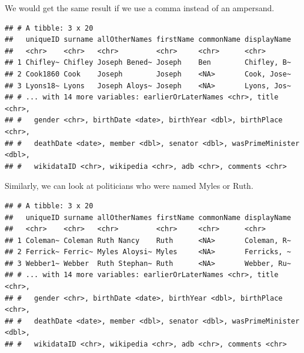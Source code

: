 \documentclass[
]{book}
\newenvironment{Shaded}{\begin{snugshade}}{\end{snugshade}}
\newcommand{\DecValTok}[1]{\textcolor[rgb]{0.00,0.00,0.81}{#1}}
\newcommand{\KeywordTok}[1]{\textcolor[rgb]{0.13,0.29,0.53}{\textbf{#1}}}
\newcommand{\NormalTok}[1]{#1}
\newcommand{\OperatorTok}[1]{\textcolor[rgb]{0.81,0.36,0.00}{\textbf{#1}}}
\newcommand{\StringTok}[1]{\textcolor[rgb]{0.31,0.60,0.02}{#1}}
\begin{document}
We would get the same result if we use a comma instead of an ampersand.

\begin{Shaded}
\end{Shaded}

\begin{verbatim}
## # A tibble: 3 x 20
##   uniqueID surname allOtherNames firstName commonName displayName
##   <chr>    <chr>   <chr>         <chr>     <chr>      <chr>      
## 1 Chifley~ Chifley Joseph Bened~ Joseph    Ben        Chifley, B~
## 2 Cook1860 Cook    Joseph        Joseph    <NA>       Cook, Jose~
## 3 Lyons18~ Lyons   Joseph Aloys~ Joseph    <NA>       Lyons, Jos~
## # ... with 14 more variables: earlierOrLaterNames <chr>, title <chr>,
## #   gender <chr>, birthDate <date>, birthYear <dbl>, birthPlace <chr>,
## #   deathDate <date>, member <dbl>, senator <dbl>, wasPrimeMinister <dbl>,
## #   wikidataID <chr>, wikipedia <chr>, adb <chr>, comments <chr>
\end{verbatim}

Similarly, we can look at politicians who were named Myles or Ruth.

\begin{Shaded}
\end{Shaded}

\begin{verbatim}
## # A tibble: 3 x 20
##   uniqueID surname allOtherNames firstName commonName displayName
##   <chr>    <chr>   <chr>         <chr>     <chr>      <chr>      
## 1 Coleman~ Coleman Ruth Nancy    Ruth      <NA>       Coleman, R~
## 2 Ferrick~ Ferric~ Myles Aloysi~ Myles     <NA>       Ferricks, ~
## 3 Webber1~ Webber  Ruth Stephan~ Ruth      <NA>       Webber, Ru~
## # ... with 14 more variables: earlierOrLaterNames <chr>, title <chr>,
## #   gender <chr>, birthDate <date>, birthYear <dbl>, birthPlace <chr>,
## #   deathDate <date>, member <dbl>, senator <dbl>, wasPrimeMinister <dbl>,
## #   wikidataID <chr>, wikipedia <chr>, adb <chr>, comments <chr>
\end{verbatim}
\end{document}
